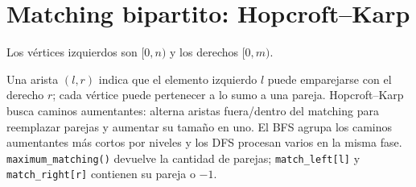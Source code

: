 \section{Matching bipartito: Hopcroft--Karp}

Los v\'ertices izquierdos son $[0,n)$ y los derechos $[0,m)$.

Una arista $(l,r)$ indica que el elemento izquierdo $l$ puede emparejarse con
el derecho $r$; cada v\'ertice puede pertenecer a lo sumo a una pareja.
Hopcroft--Karp busca caminos aumentantes: alterna aristas fuera/dentro del
matching para reemplazar parejas y aumentar su tama\~no en uno. El BFS agrupa
los caminos aumentantes m\'as cortos por niveles y los DFS procesan varios en la
misma fase. \texttt{maximum\_matching()} devuelve la cantidad de parejas;
\texttt{match\_left[l]} y \texttt{match\_right[r]} contienen su pareja o $-1$.


